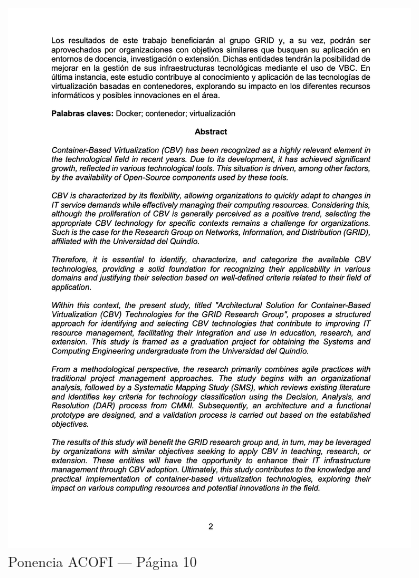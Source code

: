 \begin{figure}[H]
    \centering
    \begin{tcolorbox}[
        colback=white,
        colframe=gray!50,
        boxrule=1pt,
        arc=2pt,
        boxsep=5pt,
        left=3pt,
        right=3pt,
        top=3pt,
        bottom=3pt,
        drop shadow
    ]
        \includegraphics[width=0.95\textwidth,keepaspectratio]{apendices/ACOFI/pagina_10.png}
    \end{tcolorbox}
    \caption{Ponencia ACOFI --- Página 10}\label{fig:acofi-pagina-10}
\end{figure}
